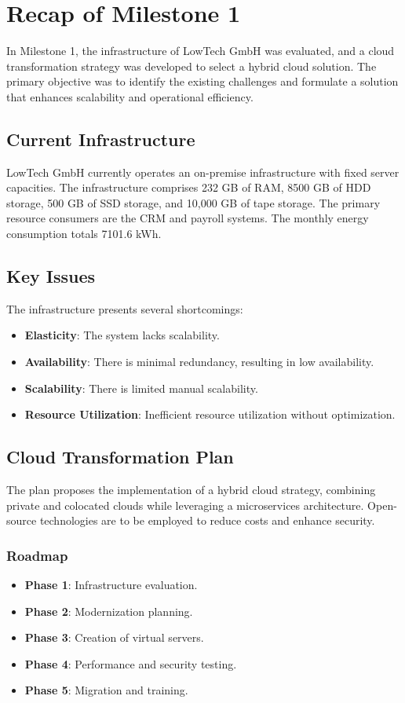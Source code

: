 \section{Recap of Milestone 1}

In Milestone 1, the infrastructure of LowTech GmbH was evaluated, and a cloud transformation strategy was developed to select a hybrid cloud solution. The primary objective was to identify the existing challenges and formulate a solution that enhances scalability and operational efficiency.

\subsection{Current Infrastructure}

LowTech GmbH currently operates an on-premise infrastructure with fixed server capacities. The infrastructure comprises 232 GB of RAM, 8500 GB of HDD storage, 500 GB of SSD storage, and 10,000 GB of tape storage. The primary resource consumers are the CRM and payroll systems. The monthly energy consumption totals 7101.6 kWh.

\subsection{Key Issues}

The infrastructure presents several shortcomings: \begin{itemize} \item \textbf{Elasticity}: The system lacks scalability. \item \textbf{Availability}: There is minimal redundancy, resulting in low availability. \item \textbf{Scalability}: There is limited manual scalability. \item \textbf{Resource Utilization}: Inefficient resource utilization without optimization. \end{itemize}

\subsection{Cloud Transformation Plan}

The plan proposes the implementation of a hybrid cloud strategy, combining private and colocated clouds while leveraging a microservices architecture. Open-source technologies are to be employed to reduce costs and enhance security.

\subsubsection{Roadmap} \begin{itemize} \item \textbf{Phase 1}: Infrastructure evaluation. \item \textbf{Phase 2}: Modernization planning. \item \textbf{Phase 3}: Creation of virtual servers. \item \textbf{Phase 4}: Performance and security testing. \item \textbf{Phase 5}: Migration and training. \end{itemize}

